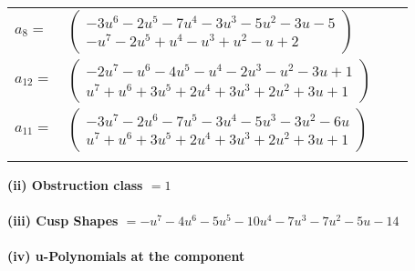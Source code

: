 \documentclass[1p]{elsarticle_modified}
\theoremstyle{definition}
\begin{document}
\begin{tabular}{m{7pt} m{180pt} m{7pt} m{180pt} }
\flushright $a_{8}=$&$\begin{pmatrix}-3 u^6-2 u^5-7 u^4-3 u^3-5 u^2-3 u-5\\- u^7-2 u^5+u^4- u^3+u^2- u+2\end{pmatrix}$ \\
\flushright $a_{12}=$&$\begin{pmatrix}-2 u^7- u^6-4 u^5- u^4-2 u^3- u^2-3 u+1\\u^7+u^6+3 u^5+2 u^4+3 u^3+2 u^2+3 u+1\end{pmatrix}$ \\
\flushright $a_{11}=$&$\begin{pmatrix}-3 u^7-2 u^6-7 u^5-3 u^4-5 u^3-3 u^2-6 u\\u^7+u^6+3 u^5+2 u^4+3 u^3+2 u^2+3 u+1\end{pmatrix}$\\&\end{tabular}
\flushleft \textbf{(ii) Obstruction class $= 1$}\\~\\
\flushleft \textbf{(iii) Cusp Shapes $= - u^7-4 u^6-5 u^5-10 u^4-7 u^3-7 u^2-5 u-14$}\\~\\
\newpage\renewcommand{\arraystretch}{1}
\flushleft \textbf{(iv) u-Polynomials at the component}\newline \\
\end{document}
